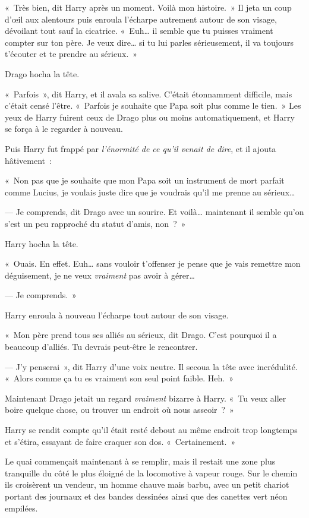 «~Très bien, dit Harry après un moment. Voilà mon histoire.~» Il jeta un coup d'œil aux alentours puis enroula l'écharpe autrement autour de son visage, dévoilant tout sauf la cicatrice. «~Euh… il semble que tu puisses vraiment compter sur ton père. Je veux dire… si tu lui parles sérieusement, il va toujours t'écouter et te prendre au sérieux.~»

Drago hocha la tête.

«~Parfois~», dit Harry, et il avala sa salive. C'était étonnamment difficile, mais c'était censé l'être. «~Parfois je souhaite que Papa soit plus comme le tien.~» Les yeux de Harry fuirent ceux de Drago plus ou moins automatiquement, et Harry se força à le regarder à nouveau.

Puis Harry fut frappé par \emph{l'énormité de ce qu'il venait de dire}, et il ajouta hâtivement~:

«~Non pas que je souhaite que mon Papa soit un instrument de mort parfait comme Lucius, je voulais juste dire que je voudrais qu'il me prenne au sérieux…

--- Je comprends, dit Drago avec un sourire. Et voilà… maintenant il semble qu'on s'est un peu rapproché du statut d'amis, non~?~»

Harry hocha la tête.

«~Ouais. En effet. Euh… sans vouloir t'offenser je pense que je vais remettre mon déguisement, je ne veux \emph{vraiment} pas avoir à gérer…

--- Je comprends.~»

Harry enroula à nouveau l'écharpe tout autour de son visage.

«~Mon père prend tous ses alliés au sérieux, dit Drago. C'est pourquoi il a beaucoup d'alliés. Tu devrais peut-être le rencontrer.

--- J'y penserai~», dit Harry d'une voix neutre. Il secoua la tête avec incrédulité. «~Alors comme ça tu es vraiment son seul point faible. Heh.~»

Maintenant Drago jetait un regard \emph{vraiment} bizarre à Harry. «~Tu veux aller boire quelque chose, ou trouver un endroit où nous asseoir~?~»

Harry se rendit compte qu'il était resté debout au même endroit trop longtemps et s'étira, essayant de faire craquer son dos. «~Certainement.~»

Le quai commençait maintenant à se remplir, mais il restait une zone plus tranquille du côté le plus éloigné de la locomotive à vapeur rouge. Sur le chemin ils croisèrent un vendeur, un homme chauve mais barbu, avec un petit chariot portant des journaux et des bandes dessinées ainsi que des canettes vert néon empilées.

